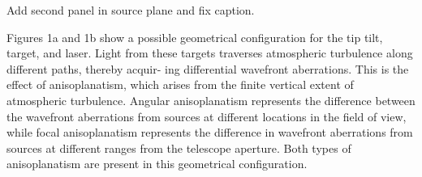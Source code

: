 \begin{notes}
Add second panel in source plane and fix caption.
\end{notes}
Figures 1a and 1b show a possible geometrical configuration for the tip tilt, target, and laser. Light from these targets traverses atmospheric turbulence along different paths, thereby acquir- ing differential wavefront aberrations. This is the effect of anisoplanatism, which arises from the finite vertical extent of atmospheric turbulence. Angular anisoplanatism represents the difference between the wavefront aberrations from sources at different locations in the field of view, while focal anisoplanatism represents the difference in wavefront aberrations from sources at different ranges from the telescope aperture. Both types of anisoplanatism are present in this geometrical configuration.
\label{fig:guide_star_schematic}
